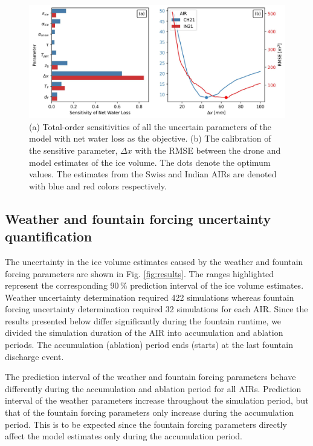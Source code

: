 \begin{figure}
	\centering
	\includegraphics[width=\linewidth]{figs/model_calibration.jpg}
  \caption{(a) Total-order sensitivities of all the uncertain parameters of the model with net water loss as the
  objective. (b) The calibration of the sensitive parameter, $\Delta x$ with the RMSE between the drone and
model estimates of the ice volume. The dots denote the optimum values. The estimates from the Swiss and Indian
\ac{AIRs} are denoted with blue and red colors respectively. }
	\label{fig:param_hist}
\end{figure}

\subsection{Weather and fountain forcing uncertainty quantification}

The uncertainty in the ice volume estimates caused by the weather and fountain forcing parameters are shown in
Fig. \ref{fig:results}. The ranges highlighted represent the corresponding $90\,\%$ prediction interval of the
ice volume estimates. Weather uncertainty determination required 422 simulations whereas fountain forcing
uncertainty determination required 32 simulations for each AIR. Since the results presented below differ
significantly during the fountain runtime, we divided the simulation duration of the AIR into accumulation and
ablation periods. The accumulation (ablation) period ends (starts) at the last fountain discharge event. 
 

The prediction interval of the weather and fountain forcing parameters behave differently during the
accumulation and ablation period for all \ac{AIRs}. Prediction interval of the weather parameters increase
throughout the simulation period, but that of the fountain forcing parameters only increase during the
accumulation period. This is to be expected since the fountain forcing parameters directly affect the model
estimates only during the accumulation period. 


